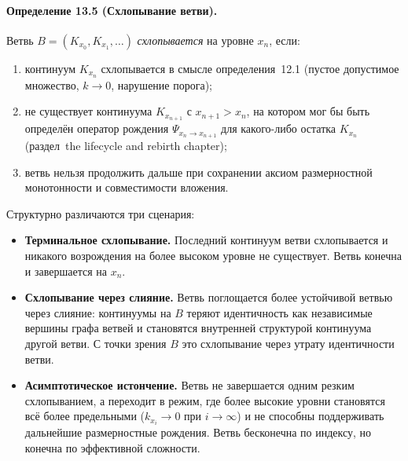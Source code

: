 \paragraph{Определение 13.5 (Схлопывание ветви).}
Ветвь \(B = (K_{x_0}, K_{x_1}, \dots)\) \emph{схлопывается} на уровне
\(x_n\), если:
\begin{enumerate}
  \item континуум \(K_{x_n}\) схлопывается в смысле
        определения~12.1 (пустое допустимое множество, \(k\to 0\),
        нарушение порога);
  \item не существует континуума \(K_{x_{n+1}}\) с \(x_{n+1}>x_n\), на
        котором мог бы быть определён оператор рождения
        \(\Psi_{x_n\to x_{n+1}}\) для какого-либо остатка \(K_{x_n}\)
        (раздел~the lifecycle and rebirth chapter);
  \item ветвь нельзя продолжить дальше при сохранении аксиом размерностной
        монотонности и совместимости вложения.
\end{enumerate}

Структурно различаются три сценария:
\begin{itemize}
  \item \textbf{Терминальное схлопывание.}\quad
        Последний континуум ветви схлопывается и никакого возрождения на более
        высоком уровне не существует. Ветвь конечна и завершается на \(x_n\).
  \item \textbf{Схлопывание через слияние.}\quad
        Ветвь поглощается более устойчивой ветвью через слияние:
        континуумы на \(B\) теряют идентичность как независимые вершины
        графа ветвей и становятся внутренней структурой континуума другой
        ветви. С точки зрения \(B\) это схлопывание через утрату
        идентичности ветви.
  \item \textbf{Асимптотическое истончение.}\quad
        Ветвь не завершается одним резким схлопыванием, а переходит в режим,
        где более высокие уровни становятся всё более предельными
        (\(k_{x_i}\to 0\) при \(i\to\infty\)) и не способны поддерживать
        дальнейшие размерностные рождения. Ветвь бесконечна по индексу,
        но конечна по эффективной сложности.
\end{itemize}

